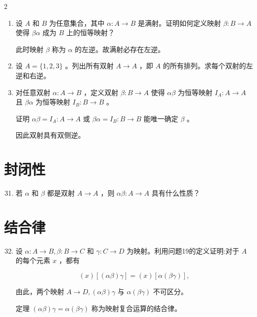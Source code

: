 \documentclass[12pt]{ctexart}
\begin{document}
\begin{multicols}{2}
\begin{enumerate}
\item 设 \(A\) 和 \(B\) 为任意集合，其中 \(\alpha  : A \rightarrow  B\) 是满射。证明如何定义映射 \(\beta  : B \rightarrow  A\) 使得 \({\beta \alpha }\) 成为 \(B\) 上的恒等映射？

  此时映射 \(\beta\) 称为 \(\alpha\) 的左逆。故满射必存在左逆。
\item 设 \(A = \{ 1,2,3\}\) 。列出所有双射 \(A \rightarrow  A\) ，即 \(A\) 的所有排列。求每个双射的左逆和右逆。
\item 对任意双射 \(\alpha  : A \rightarrow  B\) ，定义双射 \(\beta  : B \rightarrow  A\) 使得 \({\alpha \beta }\) 为恒等映射 \(I_A : A \rightarrow  A\) 且 \({\beta \alpha }\) 为恒等映射 \(I_B : B \rightarrow  B\) 。

证明 \({\alpha \beta } = I_A : A \rightarrow  A\) 或 \({\beta \alpha } = I_B : B \rightarrow  B\) 能唯一确定 \(\beta\) 。

因此双射具有双侧逆。
\end{enumerate}


\section*{封闭性}

\begin{enumerate}
\setcounter{enumi}{30}
\item 若 \(\alpha\) 和 \(\beta\) 都是双射 \(A \rightarrow  A\) ，则 \({\alpha \beta } : A \rightarrow  A\) 具有什么性质？
\end{enumerate}

\section*{结合律}

\begin{enumerate}
  \setcounter{enumi}{31}
\item 设 \(\alpha  : A \rightarrow  B,\beta  : B \rightarrow  C\) 和 \(\gamma  : C \rightarrow  D\) 为映射。利用问题19的定义证明:对于 \(A\) 的每个元素 \(x\) ，都有

\[\left( x\right) \left\lbrack  {\left( {\alpha \beta }\right) \gamma }\right\rbrack   = \left( x\right) \left\lbrack  {\alpha \left( {\beta \gamma }\right) }\right\rbrack  ,\]

由此，两个映射 \(A \rightarrow  D,\left( {\alpha \beta }\right) \gamma\) 与 \(\alpha \left( {\beta \gamma }\right)\) 不可区分。

定理 \(\left( {\alpha \beta }\right) \gamma  = \alpha \left( {\beta \gamma }\right)\) 称为映射复合运算的结合律。


\end{enumerate}
\end{multicols}
\end{document}
